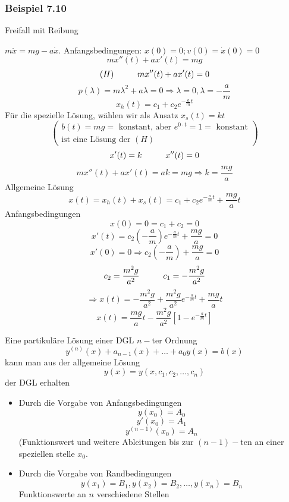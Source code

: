 \begin{enumerate}
\subsubsection*{Beispiel 7.10}
Freifall mit Reibung 
\begin{center}
\end{center}
$m\ddot{x}=mg-a\dot{x}$. Anfangsbedingungen: $x(0)=0; v(0)=\dot{x}(0)=0$
$$mx''(t)+ax'(t)=mg$$
$$(H)\hspace{10mm}mx''(t)+ax'(t)=0$$
$$p(\lambda)=m\lambda^2+a\lambda=0\Rightarrow \lambda=0,\lambda=-\frac{a}{m}$$
$$x_h(t)=c_1+c_2e^{-\frac{a}{m}t}$$
Für die spezielle Lösung, wählen wir als Ansatz $x_s(t)=kt$
\[\left( \begin{array}{l}
b(t) = mg = {\text{ konstant, aber  }}{e^{0 \cdot t}} = 1 = {\text{ konstant}}\\
{\text{ist eine Lösung der }}(H)
\end{array} \right)\]
$$x'(t)=k\hspace{10mm}x''(t)=0$$
$$mx''(t)+ax'(t)=ak=mg\Rightarrow k=\frac{mg}{a}$$
Allgemeine Lösung 
$$x(t)=x_h(t)+x_s(t)=c_1+c_2e^{-\frac{a}{m}t}+\frac{mg}{a}t$$
Anfangsbedingungen
$$x(0)=0=c_1+c_2=0$$
$$x'(t)=c_2\left(-\frac{a}{m}\right)e^{-\frac{a}{m}t}+\frac{mg}{a}=0$$
$$x'(0)=0\Rightarrow c_2\left( -\frac{a}{m}\right) +\frac{mg}{a}=0$$
$$c_2=\frac{m^2g}{a^2}\hspace{10mm}c_1=-\frac{m^2g}{a^2}$$
$$\Rightarrow x(t)=-\frac{m^2g}{a^2}+\frac{m^2g}{a^2}e^{-\frac{a}{m}t}+\frac{mg}{a}t$$
$$x(t)=\frac{mg}{a}t-\frac{m^2g}{a^2}\left[ 1-e^{-\frac{a}{m}t}\right]$$
\end{enumerate}
Eine partikuläre Lösung einer DGL $n-$ter Ordnung $$y^{(n)}{(x)}+a_{n-1}(x)+\dots+a_0 y(x)=b(x)$$ kann man aus der allgemeine Lösung 
$$y(x)=y(x,c_1,c_2,\dots,c_n)$$ der DGL erhalten
\begin{itemize}
\item Durch die Vorgabe von Anfangsbedingungen 
$$y(x_0)=A_0$$
$$y'(x_0)=A_1$$
$$y^{(n-1)}(x_0)=A_n$$
(Funktionswert und weitere Ableitungen bis zur $(n-1)-$ten an einer speziellen stelle $x_0$.
\item Durch die Vorgabe von Randbedingungen 
$$y(x_1)=B_1, y(x_2)=B_2, \dots, y(x_n)=B_n$$ Funktionswerte an $n$ verschiedene Stellen
\end{itemize}

